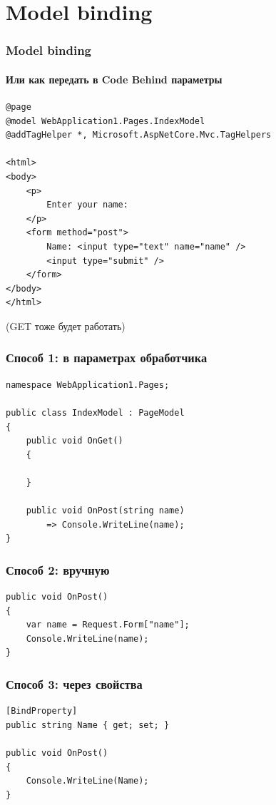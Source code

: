 \documentclass{../../slides-style}
\begin{document}
    \section{Model binding}

    \begin{frame}[fragile]
        \frametitle{Model binding}
        \framesubtitle{Или как передать в Code Behind параметры}
        \begin{small}
            \begin{verbatim}
@page
@model WebApplication1.Pages.IndexModel
@addTagHelper *, Microsoft.AspNetCore.Mvc.TagHelpers

<html>
<body>
    <p>
        Enter your name:
    </p>
    <form method="post">
        Name: <input type="text" name="name" />
        <input type="submit" />
    </form>
</body>
</html>
            \end{verbatim}
        \end{small}
        (GET тоже будет работать)
    \end{frame}

    \begin{frame}[fragile]
        \frametitle{Способ 1: в параметрах обработчика}
        \begin{small}
            \begin{verbatim}
namespace WebApplication1.Pages;

public class IndexModel : PageModel
{
    public void OnGet()
    {

    }

    public void OnPost(string name)
        => Console.WriteLine(name);
}
            \end{verbatim}
        \end{small}
    \end{frame}

    \begin{frame}[fragile]
        \frametitle{Способ 2: вручную}
        \begin{small}
            \begin{verbatim}
public void OnPost()
{
    var name = Request.Form["name"];
    Console.WriteLine(name);
}
            \end{verbatim}
        \end{small}
    \end{frame}

    \begin{frame}[fragile]
        \frametitle{Способ 3: через свойства}
        \begin{small}
            \begin{verbatim}
[BindProperty]
public string Name { get; set; }

public void OnPost()
{
    Console.WriteLine(Name);
}
            \end{verbatim}
        \end{small}
    \end{frame}
\end{document}
